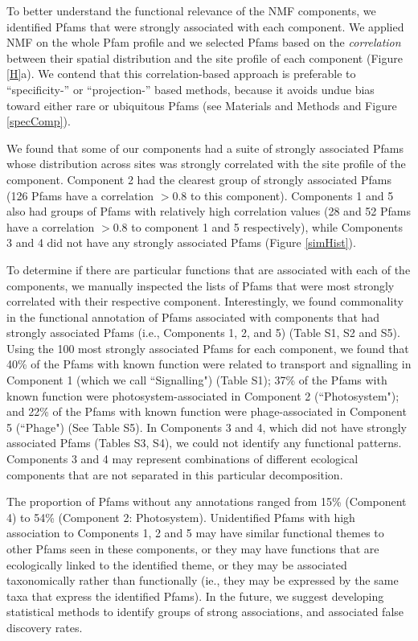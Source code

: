 To better understand the functional relevance of the NMF components, we identified Pfams that were strongly associated with each component.  We applied NMF on the whole Pfam profile and we selected Pfams based on the \emph{correlation} between their spatial distribution and the site profile of each component (Figure \ref{H}a).  We contend that this correlation-based approach is preferable to ``specificity-'' \cite{jiang_non-negative_2012} or ``projection-'' \cite{carmona2006biclustering, kim_sparse_2007} based methods, because it avoids undue bias toward either rare or ubiquitous Pfams (see Materials and Methods and Figure \ref{specComp}).

We found that some of our components had a suite of strongly associated Pfams whose distribution across sites was strongly correlated with the site profile of the component. Component 2 had the clearest group of strongly associated Pfams (126 Pfams have a correlation $> 0.8$ to this component).  Components 1 and 5 also had groups of Pfams with relatively high correlation values (28 and 52 Pfams have a correlation $> 0.8$ to component 1 and 5 respectively), while Components 3 and 4 did not have any strongly associated Pfams (Figure \ref{simHist}). 

To determine if there are particular functions that are associated with each of the components, we manually inspected the lists of Pfams that were most strongly correlated with their respective component. Interestingly, we found commonality in the functional annotation of Pfams associated with components that had strongly associated Pfams (i.e., Components 1, 2, and 5) (Table S1, S2 and S5). Using the 100 most strongly associated Pfams for each component, we found that 40\% of the Pfams with known function were related to transport and signalling in Component 1 (which we call ``Signalling") (Table S1); 37\% of the Pfams with known function were photosystem-associated in Component 2 (``Photosystem"); and 22\% of the Pfams with known function were phage-associated in Component 5 (``Phage") (See Table S5). In Components 3 and 4, which did not have strongly associated Pfams (Tables S3, S4), we could not identify any functional patterns.  Components 3 and 4 may represent combinations of different ecological components that are not separated in this particular decomposition. 

The proportion of Pfams without any annotations ranged from 15\% (Component 4) to 54\% (Component 2: Photosystem). Unidentified Pfams with high association to Components 1, 2 and 5 may have similar functional themes to other Pfams seen in these components, or they may have functions that are ecologically linked to the identified theme, or they may be associated taxonomically rather than functionally (ie., they may be expressed by the same taxa that express the identified Pfams).  In the future, we suggest developing statistical methods to identify groups of strong associations, and associated false discovery rates.

